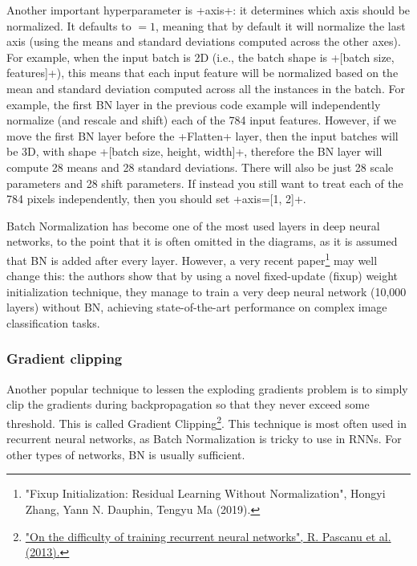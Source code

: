 Another important hyperparameter is \cd+axis+: it determines which axis should be normalized. It defaults to $=1$, meaning that by default it will normalize the last axis (using the means and standard deviations computed across the other axes). For example, when the input batch is 2D (i.e., the batch shape is \cd+[batch size, features]+), this means that each input feature will be normalized based on the mean and standard deviation computed across all the instances in the batch. For example, the first BN layer in the previous code example will independently normalize (and rescale and shift) each of the 784 input features. However, if we move the first BN layer before the \cd+Flatten+ layer, then the input batches will be 3D, with shape \cd+[batch size, height, width]+, therefore the BN layer will compute 28 means and 28 standard deviations. There will also be just 28 scale parameters and 28 shift parameters. If instead you still want to treat each of the 784 pixels independently, then you should set \cd+axis=[1, 2]+.

Batch Normalization has become one of the most used layers in deep neural networks, to the point that it is often omitted in the diagrams, as it is assumed that BN is added after every layer. However, a very recent paper\footnote{"Fixup Initialization: Residual Learning Without Normalization", Hongyi Zhang, Yann N. Dauphin, Tengyu Ma (2019).} may well change this: the authors show that by using a novel fixed-update (fixup) weight initialization technique, they manage to train a very deep neural network (10,000 layers) without BN, achieving state-of-the-art performance on complex image classification tasks.

\subsubsection{Gradient clipping}
Another popular technique to lessen the exploding gradients problem is to simply clip the gradients during backpropagation so that they never exceed some threshold. This is called Gradient Clipping\footnote{\href{https://homl.info/52}{"On the difficulty of training recurrent neural networks", R. Pascanu et al. (2013).}}. This technique is most often used in recurrent neural networks, as Batch Normalization is tricky to use in RNNs. For other types of networks, BN is usually sufficient.

